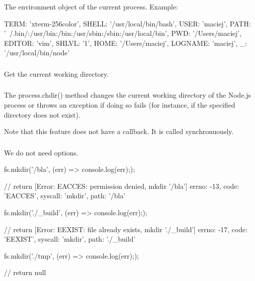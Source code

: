 The environment object of the current process. Example:
\begin{js}
  {
    TERM: 'xterm-256color',
    SHELL: '/usr/local/bin/bash',
    USER: 'maciej',
    PATH: '~/.bin/:/usr/bin:/bin:/usr/sbin:/sbin:/usr/local/bin',
    PWD: '/Users/maciej',
    EDITOR: 'vim',
    SHLVL: '1',
    HOME: '/Users/maciej',
    LOGNAME: 'maciej',
    _: '/usr/local/bin/node'
  }
\end{js}

\subsubsection{}

Get the current working directory.

\subsubsection{}

The process.chdir() method changes the current working directory of the
Node.js process or throws an exception if doing so fails (for instance, if the
specified directory does not exist).

Note that this feature does not have a callback. It is called synchronuously.

\subsubsection{}

We do not need options.

\begin{js}
  fs.mkdir('/bla', (err) => {console.log(err);});

  // return
  { [Error: EACCES: permission denied, mkdir '/bla']
    errno: -13,
    code: 'EACCES',
    syscall: 'mkdir',
    path: '/bla' }
\end{js}


\begin{js}
  fs.mkdir('./_build', (err) => {console.log(err);});

  // return
  { [Error: EEXIST: file already exists, mkdir './_build']
    errno: -17,
    code: 'EEXIST',
    syscall: 'mkdir',
    path: './_build' }
\end{js}

\begin{js}
  fs.mkdir('./tmp', (err) => {console.log(err);});

  // return
  null
\end{js}




